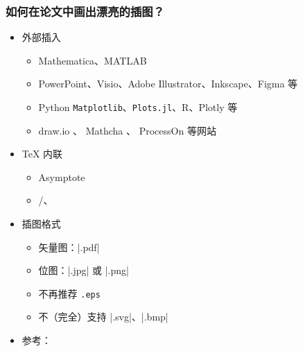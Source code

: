 \begin{frame}[fragile]
\frametitle{如何在论文中画出漂亮的插图？}
\begin{itemize}
  \item<+-> 外部插入

    \begin{itemize}
      \item Mathematica、MATLAB
      \item PowerPoint、Visio、Adobe Illustrator、Inkscape、Figma 等
      \item Python \texttt{Matplotlib}、\texttt{Plots.jl}、R、Plotly 等
      \item draw.io 、
            Mathcha 、
            ProcessOn  等网站
    \end{itemize}

  \item<+-> \TeX{} 内联

    \begin{itemize}
      \item Asymptote
      \item \alert{/、}
    \end{itemize}

  \item<+-> 插图格式

    \begin{itemize}
      \item 矢量图：|.pdf|
      \item 位图：|.jpg| 或 |.png|
      \item \alert{不再推荐 \texttt{.eps}}
      \item 不（完全）支持 |.svg|、|.bmp|
    \end{itemize}

  \item<+-> 参考：
\end{itemize}
\end{frame}


